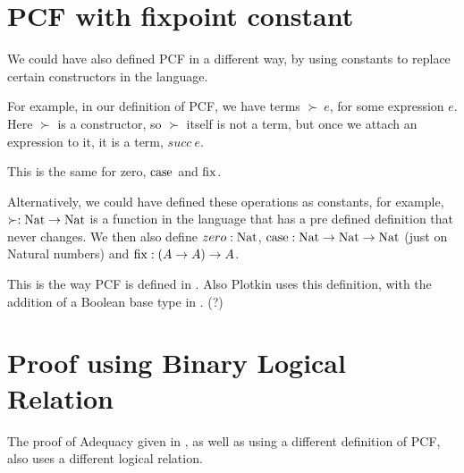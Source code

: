 \section{PCF with fixpoint constant}

We could have also defined PCF in a different way, by using constants to replace certain constructors in the language.

For example, in our definition of PCF, we have terms $\succ \ e$, for some expression $e$. Here $\succ$ is a constructor, so $\succ$ itself is not a term, but once we attach an expression to it, it is a term, $succ \ e$.

This is the same for zero, $\operatorname{case}$ and $\operatorname{fix}$.

Alternatively, we could have defined these operations as constants, for example, $\succ : \operatorname{Nat} \to \operatorname{Nat}$ is a function in the language that has a pre defined definition that never changes. We then also define $zero : \operatorname{Nat}$, $\operatorname{case} : \operatorname{Nat} \to \operatorname{Nat} \to \operatorname{Nat}$ (just on Natural numbers) and $\operatorname{fix} : (A \to A) \to A$.

This is the way PCF is defined in \citep{Streicher06}. Also Plotkin uses this definition, with the addition of a Boolean base type in \citep{Plotkin77}. (?)

\section{Proof using Binary Logical Relation}

The proof of Adequacy given in \citep{Streicher06}, as well as using a different definition of PCF, also uses a different logical relation.


